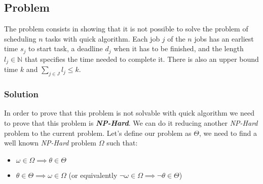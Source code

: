 \documentclass[11pt]{article}
\begin{document}
\subsection*{Problem}
The problem consists in showing that it is not possible to solve the problem of scheduling $n$ tasks with quick algorithm. Each job  $j$ of the $n$ jobs has an earliest time $s_j$ to start task, a deadline $d_j$ when it has to be finished, and the length $l_j \in \mathbb{N}$ that specifies the time needed to complete it. There is also an upper bound time $k$ and $\sum\limits_{j \in J}l_j \le k$.
\subsubsection*{Solution}
In order to prove that this problem is not solvable with quick algorithm we need to prove that this problem is \textbf{\textit{NP-Hard}}. We can do it reducing another \textit{NP-Hard} problem to the current problem. Let's define our problem as $\Theta$, we need to find a well known \textit{NP-Hard} problem $\Omega$ such that:
\begin{itemize}
	\item $\omega \in \Omega \implies  \theta \in \Theta$
	\item $\theta \in \Theta\implies  \omega \in \Omega$ (or equivalently $\neg\omega \in \Omega \implies  \neg\theta \in \Theta$)
\end{itemize}
\end{document}
